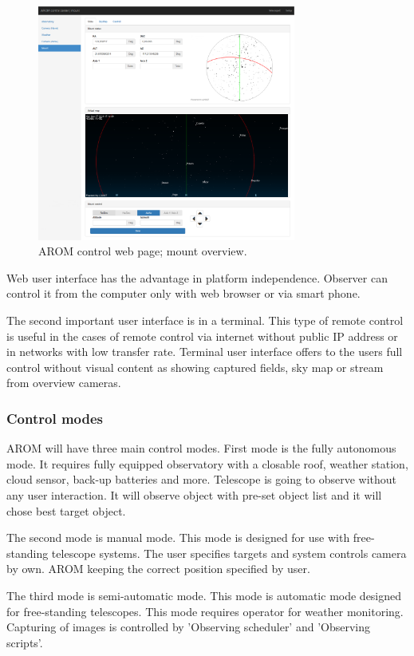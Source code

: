\documentclass{poster16}
\begin{document}
\begin{figure}[h!]
\begin{center}
\includegraphics[width=85mm]{img/arom_ui.eps}
\caption{AROM control web page; mount overview.} 
\end{center}
\end{figure}
\pagebreak

Web user interface has the advantage in platform independence. Observer can control it from the computer only with web browser or via smart phone. 

The second important user interface is in a terminal. This type of remote control is useful in the cases of remote control via internet without public IP address or in networks with low transfer rate. Terminal user interface offers to the users full control without visual content as showing captured fields, sky map or stream from overview cameras.

\subsubsection{Control modes}
AROM will have three main control modes. First mode is the fully autonomous mode. It requires fully equipped observatory with a closable roof, weather station, cloud sensor, back-up batteries and more. Telescope is going to observe without any user interaction. It will observe object with pre-set object list and it will chose best target object. 

The second mode is manual mode. This mode is designed for use with free-standing telescope systems. The user specifies targets and system controls camera by own. AROM keeping the correct position specified by user.

The third mode is semi-automatic mode. This mode is automatic mode designed for free-standing telescopes. This mode requires operator for weather monitoring. Capturing of images is controlled by 'Observing scheduler' and 'Observing scripts'.
\end{document}
